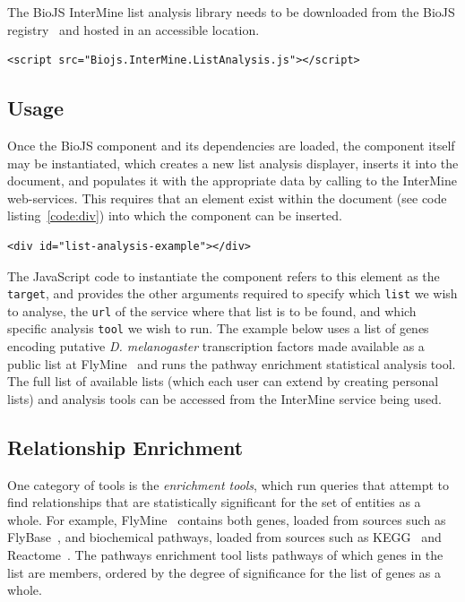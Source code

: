 \documentclass[10pt,a4paper,twocolumn]{article}
\begin{document}
The BioJS InterMine list analysis library needs to be downloaded from the BioJS
registry~\cite{site:biojs-registry} and hosted in an accessible location.

\begin{lstlisting}[caption={Loading the list analysis tools library.}, label={code:loading}]
<script src="Biojs.InterMine.ListAnalysis.js"></script>
\end{lstlisting}

\subsection*{Usage}

Once the BioJS component and its dependencies are loaded, the component itself
may be instantiated, which creates a new list analysis displayer, inserts it
into the document, and populates it with the appropriate data by calling to the
InterMine web-services. This requires that an element exist within the document
(see code listing~\ref{code:div}) into which the component can be inserted.

\begin{lstlisting}[caption={The target document element},label={code:div}]
<div id="list-analysis-example"></div>
\end{lstlisting}

The JavaScript code to instantiate the component refers to this element as the
\texttt{target}, and provides the other arguments required to specify which
\texttt{list} we wish to analyse, the \texttt{url} of the service where that
list is to be found, and which specific analysis \texttt{tool} we wish to run.
The example below uses a list of genes encoding putative \emph{D. melanogaster}
transcription factors made available as a public list at FlyMine~\cite{flymine}
and runs the pathway enrichment statistical analysis tool. The full list of
available lists (which each user can extend by creating personal lists) and
analysis tools can be accessed from the InterMine service being used.

\subsection*{Relationship Enrichment}

One category of tools is the \emph{enrichment tools}, which run queries that
attempt to find relationships that are statistically significant for the set of
entities as a whole.  For example, FlyMine~\cite{flymine} contains both genes,
loaded from sources such as FlyBase~\cite{flybase}, and biochemical pathways,
loaded from sources such as KEGG~\cite{kegg} and Reactome~\cite{reactome}.  The
pathways enrichment tool lists pathways of which genes in the list are members,
ordered by the degree of significance for the list of genes as a whole.
\end{document}
